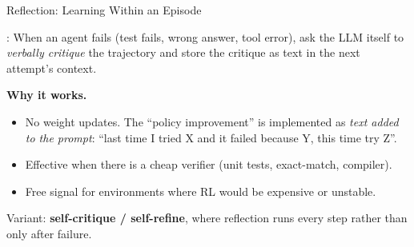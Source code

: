 \begin{frame}{Reflection: Learning Within an Episode}

  \cite{shinn2023reflexion}: When an agent fails (test fails, wrong answer, tool error),
  ask the LLM itself to \emph{verbally critique} the trajectory and store the critique
  as text in the next attempt's context.

  \vspace{0.3em}
  \begin{center}
  \end{center}

  \vspace{0.3em}
  \textbf{Why it works.}
  \begin{itemize}[nosep]
    \item No weight updates. The ``policy improvement'' is implemented as
      \emph{text added to the prompt}: ``last time I tried X and it failed because Y, this time try Z''.
    \item Effective when there is a cheap verifier (unit tests, exact-match, compiler).
    \item Free signal for environments where RL would be expensive or unstable.
  \end{itemize}

  \vspace{0.3em}
  Variant: \textbf{self-critique / self-refine}, where reflection runs every step rather than only after failure.
\end{frame}

